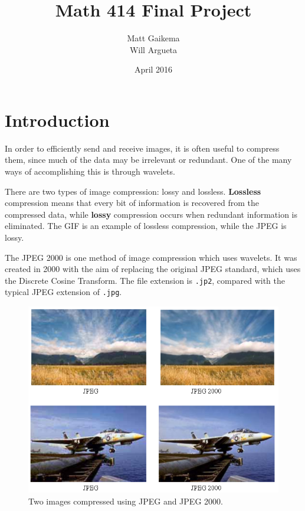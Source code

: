 \documentclass{article}
\title{Math 414 Final Project}
\author{Matt Gaikema \\ Will Argueta}
\date{April 2016}
\begin{document}
\maketitle

\section{Introduction}

In order to efficiently send and receive images, it is often useful to compress them, 
since much of the data may be irrelevant or redundant.
One of the many ways of accomplishing this is through wavelets.

There are two types of image compression: lossy and lossless.
\textbf{Lossless} compression means that every bit of information is recovered from the compressed data,
while \textbf{lossy} compression occurs when redundant information is eliminated.
The GIF is an example of lossless compression, while the JPEG is lossy.

The JPEG 2000 is one method of image compression which uses wavelets.
It was created in 2000 with the aim of replacing the original JPEG standard, 
which uses the Discrete Cosine Transform.
The file extension is \verb|.jp2|, compared with the typical JPEG extension of \verb|.jpg|.

\begin{figure}
	\centering
	\includegraphics[scale=0.4]{resources/comparison.png}
	\caption{Two images compressed using JPEG and JPEG 2000.\cite{comparison}}
	\label{fig:compare}
\end{figure}
\end{document}

